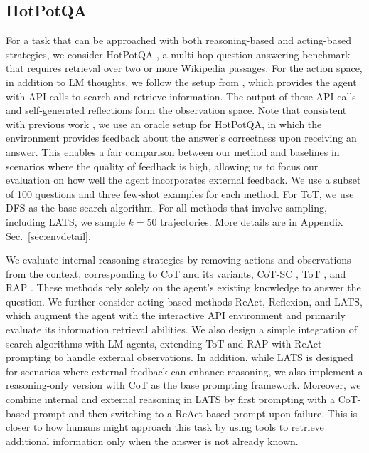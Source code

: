 \documentclass{article}
\newcommand{\yxw}[1]{\textcolor{blue}{[{\bf yxw:} #1]}}
\newcommand{\kai}[1]{\textcolor{purple}{[{\bf kai:} #1]}}
\newcommand{\az}[1]{\textcolor{orange}{[{\bf andy:} #1]}}
\theoremstyle{plain}
\theoremstyle{definition}
\theoremstyle{remark}
\begin{document}
\subsection{HotPotQA}
\label{sec:HotPotQA}



For a task that can be approached with both reasoning-based and acting-based strategies, we consider HotPotQA \citep{yang2018hotpotqa}, a multi-hop question-answering benchmark that requires retrieval over two or more Wikipedia passages. For the action space, in addition to LM thoughts, we follow the setup from \citet{yao2023react}, which provides the agent with API calls to search and retrieve information. The output of these API calls and self-generated reflections form the observation space. Note that consistent with previous work \cite{yao2023react, shinn2023reflexion}, we use an oracle setup for HotPotQA, in which the environment provides feedback about the answer's correctness upon receiving an answer. This enables a fair comparison between our method and baselines in scenarios where the quality of feedback is high, allowing us to focus our evaluation on how well the agent incorporates external feedback. We use a subset of 100 questions and three few-shot examples for each method. For ToT, we use DFS as the base search algorithm. For all methods that involve sampling, including LATS, we sample $k=50$ trajectories. More details are in Appendix Sec.~\ref{sec:envdetail}.

We evaluate internal reasoning strategies by removing actions and observations from the context, corresponding to CoT \citep{wei2022chain} and its variants, CoT-SC \citep{wang2022self}, ToT \citep{yao2023tree}, and RAP \citep{hao2023reasoning}. These methods rely solely on the agent's existing knowledge to answer the question. We further consider acting-based methods ReAct, Reflexion, and LATS, which augment the agent with the interactive API environment and primarily evaluate its information retrieval abilities. We also design a simple integration of search algorithms with LM agents, extending ToT and RAP with ReAct prompting to handle external observations. In addition, while LATS is designed for scenarios where external feedback can enhance reasoning, we also implement a reasoning-only version with CoT as the base prompting framework. Moreover, we combine internal and external reasoning in LATS by first prompting with a CoT-based prompt and then switching to a ReAct-based prompt upon failure. This is closer to how humans might approach this task by using tools to retrieve additional information only when the answer is not already known. 
\end{document}
